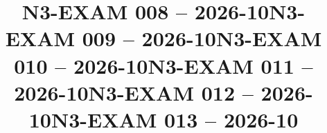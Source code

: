 \documentclass{ip-exam}
\begin{document}







\cleartoeven
\setcounter{questioncounter}{0}
\setcounter{page}{1}
\title{N3-EXAM 008 -- 2026-10}
\makeexamheader








\cleartoeven
\setcounter{questioncounter}{0}
\setcounter{page}{1}
\title{N3-EXAM 009 -- 2026-10}
\makeexamheader








\cleartoeven
\setcounter{questioncounter}{0}
\setcounter{page}{1}
\title{N3-EXAM 010 -- 2026-10}
\makeexamheader








\cleartoeven
\setcounter{questioncounter}{0}
\setcounter{page}{1}
\title{N3-EXAM 011 -- 2026-10}
\makeexamheader








\cleartoeven
\setcounter{questioncounter}{0}
\setcounter{page}{1}
\title{N3-EXAM 012 -- 2026-10}
\makeexamheader








\cleartoeven
\setcounter{questioncounter}{0}
\setcounter{page}{1}
\title{N3-EXAM 013 -- 2026-10}
\makeexamheader
\end{document}
